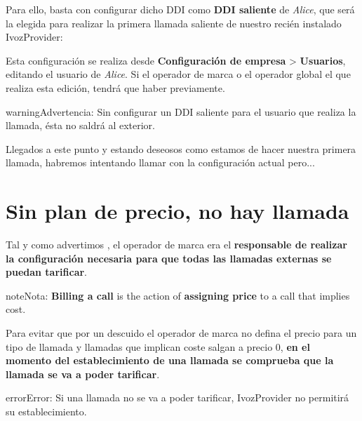 \documentclass[letterpaper,10pt,spanish]{sphinxmanual}
\begin{document}
Para ello, basta con configurar dicho DDI como \textbf{DDI saliente} de \emph{Alice}, que será la elegida para realizar la primera llamada saliente de nuestro recién instalado IvozProvider:

\noindent{}

Esta configuración se realiza desde \textbf{Configuración de empresa} \textgreater{} \textbf{Usuarios}, editando el usuario de \emph{Alice}. Si el operador de marca o el operador global el que realiza esta edición, tendrá que haber {\hyperref[internal_calls/brand_portal:emulate\string-company]{}} previamente.

\begin{notice}{warning}{Advertencia:}
Sin configurar un DDI saliente para el usuario que realiza la llamada, ésta no saldrá al exterior.
\end{notice}

Llegados a este punto y estando deseosos como estamos de hacer nuestra primera llamada, habremos intentando llamar con la configuración actual pero...


\section{Sin plan de precio, no hay llamada}
\label{external_outgoing_calls/noplan_nocall:noplan-nocall}\label{external_outgoing_calls/noplan_nocall::doc}\label{external_outgoing_calls/noplan_nocall:no-pricing-plan-no-call}
Tal y como advertimos {\hyperref[operation_roles/index:brand\string-responsibilities]{}}, el operador de marca era el \textbf{responsable de realizar la configuración necesaria para que todas las llamadas externas se puedan tarificar}.

\begin{notice}{note}{Nota:}
\textbf{Billing a call} is the action of \textbf{assigning price} to a call that implies
cost.
\end{notice}

Para evitar que por un descuido el operador de marca no defina el precio para un tipo de llamada y llamadas que implican coste salgan a precio 0, \textbf{en el momento del establecimiento de una llamada se comprueba que la llamada se va a poder tarificar}.

\begin{notice}{error}{Error:}
Si una llamada no se va a poder tarificar, IvozProvider no permitirá su establecimiento.
\end{notice}
\end{document}
